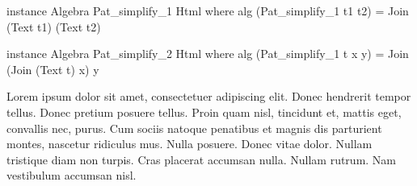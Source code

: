 \begin{code}
instance Algebra Pat_simplify_1 Html where
  alg (Pat_simplify_1 t1 t2) = Join (Text t1) (Text t2)

instance Algebra Pat_simplify_2 Html where
  alg (Pat_simplify_1 t x y) = Join (Join (Text t) x) y
\end{code}


Lorem ipsum dolor sit amet, consectetuer adipiscing elit. Donec hendrerit tempor
tellus. Donec pretium posuere tellus. Proin quam nisl, tincidunt et, mattis
eget, convallis nec, purus. Cum sociis natoque penatibus et magnis dis
parturient montes, nascetur ridiculus mus. Nulla posuere. Donec vitae dolor.
Nullam tristique diam non turpis. Cras placerat accumsan nulla. Nullam rutrum.
Nam vestibulum accumsan nisl\cite{godefroid2005dart}.
